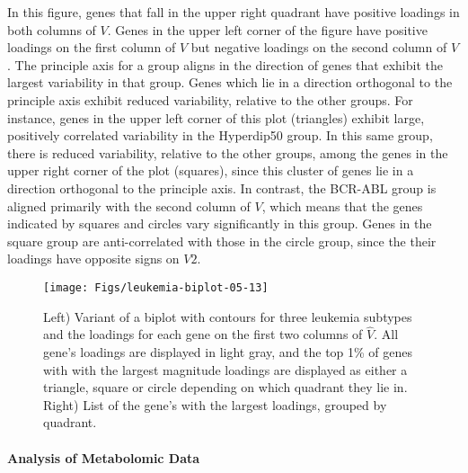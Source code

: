 \documentclass{article}
\begin{document}
In this figure, genes that fall in the upper right quadrant have
positive loadings in both columns of $V$. Genes in the upper left
corner of the figure have positive loadings on the first column of $V$
but negative loadings on the second column of $V$.  The principle axis
for a group aligns in the direction of genes that exhibit the largest
variability in that group.  Genes which lie in a direction orthogonal
to the principle axis exhibit reduced variability, relative to the
other groups. For instance, genes in the upper left corner of this
plot (triangles) exhibit large, positively correlated variability in
the Hyperdip50 group.  In this same group, there is reduced
variability, relative to the other groups, among the genes in the
upper right corner of the plot (squares), since this cluster of genes lie in
a direction orthogonal to the principle axis.  In contrast, the
BCR-ABL group is aligned primarily with the second column of $V$,
which means that the genes indicated by squares and circles vary
significantly in this group.  Genes in the square group are
anti-correlated with those in the circle group, since the their
loadings have opposite signs on $V2$.


  \begin{figure}[!ht]
    \centering
    \texttt{[image: Figs/leukemia-biplot-05-13]}
    \qquad
\raisebox{1.25\height}{
\footnotesize

}
\caption{Left) Variant of a biplot with contours for three leukemia
  subtypes and the loadings for each gene on the first two columns of
  $\hat{V}$.  All gene's loadings are displayed in light gray, and the
  top 1\% of genes with with the largest magnitude loadings are
  displayed as either a triangle, square or circle depending on which
  quadrant they lie in.  Right) List of the gene's with the largest
  loadings, grouped by quadrant. }
\label{fig:leukemiaBiplot}
  \end{figure}

\paragraph{Analysis of Metabolomic Data}
\end{document}
